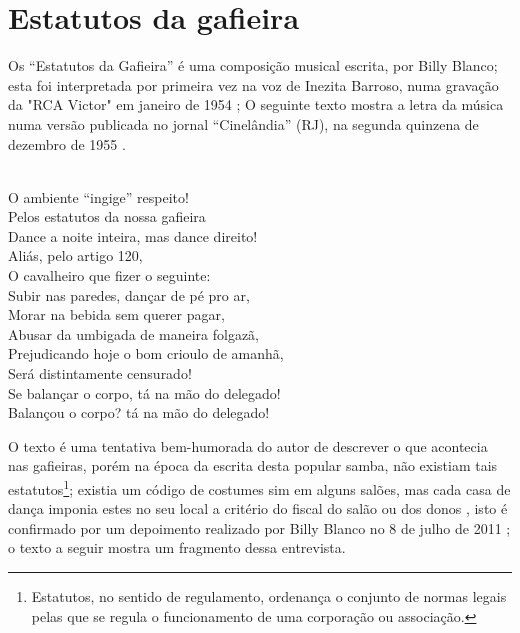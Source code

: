 \section{Estatutos da gafieira}
Os ``Estatutos da Gafieira'' é uma composição musical escrita, por Billy Blanco;
esta foi interpretada por primeira vez na voz de Inezita Barroso, 
numa gravação da "RCA Victor" em janeiro de 1954 \cite{musicaestatuto};
O seguinte texto mostra a letra da música numa 
versão publicada no jornal ``Cinelândia''  (RJ),
na segunda quinzena de dezembro de 1955 \cite[pp. 95]{musicaestatutojournal1955}.
\begin{citando}%
\\
O ambiente ``ingige'' respeito!\\
Pelos estatutos da nossa gafieira\\
Dance a noite inteira, mas dance direito!\\
Aliás, pelo artigo 120,\\
O cavalheiro que fizer o seguinte:\\
Subir nas paredes, dançar de pé pro ar,\\
Morar na bebida sem querer pagar,\\
Abusar da umbigada de maneira folgazã,\\
Prejudicando hoje o bom crioulo de amanhã,\\
Será distintamente censurado!\\
Se balançar o corpo, tá na mão do delegado!\\
Balançou o corpo? tá na mão do delegado!\\
\end{citando}
O texto é uma tentativa bem-humorada do autor de descrever o que acontecia 
nas gafieiras, porém na época da escrita desta popular samba, não
existiam tais estatutos\footnote{Estatutos, no sentido de regulamento, 
ordenança o conjunto de normas legais pelas que se regula o funcionamento de uma corporação ou associação.};
existia um código de costumes sim \cite[pp. 13]{respeitojournalbrasil1} em alguns salões, 
mas cada casa de dança imponia estes no seu local a critério do fiscal do salão ou dos 
donos \cite[pp. 10]{simoesjournalbrasil1} \cite[pp. 6 - cad. B]{entrevistajuliojournalbrasil1} \cite[pp. 37]{gafieirajournalmanchete},
isto é confirmado por um depoimento realizado por 
Billy Blanco no 8 de julho de 2011 \cite[pp. 56]{depoimentobilly}; o texto a seguir
mostra um fragmento dessa entrevista.

